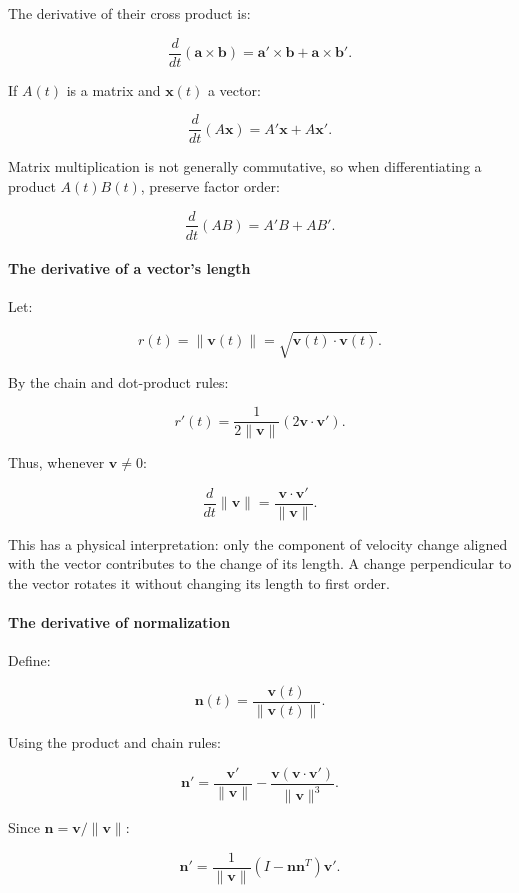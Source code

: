 The derivative of their cross product is:

\[
\frac d{dt}(\mathbf a\times\mathbf b) =\mathbf a'\times\mathbf b+\mathbf a\times\mathbf b'.
\]

If \(A(t)\) is a matrix and \(\mathbf x(t)\) a vector:

\[
\frac d{dt}(A\mathbf x) =A'\mathbf x+A\mathbf x'.
\]

Matrix multiplication is not generally commutative, so when differentiating a product \(A(t)B(t)\), preserve factor order:

\[
\frac d{dt}(AB)=A'B+AB'.
\]

\paragraph{The derivative of a vector's length}\label{02-foundations-ii-ch021-the-derivative-of-a-vectors-length}

Let:

\[
r(t)=\|\mathbf v(t)\| =\sqrt{\mathbf v(t)\cdot\mathbf v(t)}.
\]

By the chain and dot-product rules:

\[
r'(t)=\frac1{2\|\mathbf v\|} \left(2\mathbf v\cdot\mathbf v'\right).
\]

Thus, whenever \(\mathbf v\ne0\):

\[
\boxed{\frac d{dt}\|\mathbf v\| =\frac{\mathbf v\cdot\mathbf v'}{\|\mathbf v\|}}.
\]

This has a physical interpretation: only the component of velocity change aligned with the vector contributes to the change of its length. A change perpendicular to the vector rotates it without changing its length to first order.

\paragraph{The derivative of normalization}\label{02-foundations-ii-ch021-the-derivative-of-normalization}

Define:

\[
\mathbf n(t)=\frac{\mathbf v(t)}{\|\mathbf v(t)\|}.
\]

Using the product and chain rules:

\[
\mathbf n' = \frac{\mathbf v'}{\|\mathbf v\|} - \frac{\mathbf v(\mathbf v\cdot\mathbf v')}{\|\mathbf v\|^3}.
\]

Since \(\mathbf n=\mathbf v/\|\mathbf v\|\):

\[
\boxed{ \mathbf n' = \frac1{\|\mathbf v\|} \left(I-\mathbf n\mathbf n^T\right)\mathbf v' }.
\]

